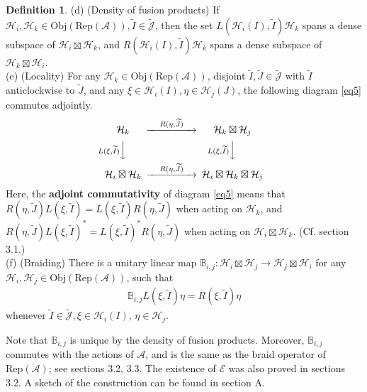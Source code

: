 \documentclass[12pt,a4paper]{article}
\theoremstyle{definition}
\newtheorem{df}{Definition}[subsection]
\theoremstyle{plain}
\newcommand{\mc}{\mathcal}
\newcommand{\wtd}{\widetilde}
\newcommand{\scr}{\mathscr}
\newcommand{\Jtd}{\widetilde{\mathcal J}}
\newcommand{\RepA}{\mathrm{Rep}(\mc A)}
\newcommand{\mbb}{\mathbb}
\newcommand{\Obj}{\mathrm{Obj}}
\numberwithin{equation}{subsection}
\begin{document}
\begin{df}
	(d) (Density of fusion products) If $\mc H_i,\mc H_k\in\Obj(\RepA),\wtd I\in\Jtd$, then the set $L(\mc H_i(I),\wtd I)\mc H_k$ spans a dense subspace of $\mc H_i\boxtimes\mc H_k$, and $R(\mc H_i(I),\wtd I)\mc H_k$ spans a dense subspace of $\mc H_k\boxtimes\mc H_i$.\\
	(e) (Locality) For any $\mc H_k\in\Obj(\RepA)$, disjoint $\wtd I,\wtd J\in\Jtd$ with $\wtd I$ anticlockwise to $\wtd J$, and any $\xi\in\mc H_i(I),\eta\in\mc H_j(J)$, the following diagram \eqref{eq5}  commutes adjointly.
	\begin{align}\label{eq5}
	\begin{CD}
	\mc H_k @> \quad R(\eta,\wtd J)\quad   >> \mc H_k\boxtimes\mc H_j\\
	@V L(\xi,\wtd I)   V  V @V L(\xi,\wtd I) VV\\
	\mc H_i\boxtimes\mc H_k @> \quad R(\eta,\wtd J) \quad  >> \mc H_i\boxtimes\mc H_k\boxtimes\mc H_j
	\end{CD}
	\end{align}
	Here, the \textbf{adjoint commutativity} of diagram \eqref{eq5} means that $R(\eta,\wtd J)L(\xi,\wtd I)=L(\xi,\wtd I)R(\eta,\wtd J)$ when acting on $\mc H_k$, and $R(\eta,\wtd J)L(\xi,\wtd I)^*=L(\xi,\wtd I)^*R(\eta,\wtd J)$ when acting on $\mc H_i\boxtimes\mc H_k$. (Cf. \cite{Gui21a} section 3.1.)\\
	(f) (Braiding) There is a unitary linear map $\mbb B_{i,j}:\mc H_i\boxtimes\mc H_j\rightarrow\mc H_j\boxtimes \mc H_i$  for any $\mc H_i,\mc H_j\in\Obj(\RepA)$, such that  
	\begin{align}
	\mbb B_{i,j} L(\xi,\wtd I)\eta=R(\xi,\wtd I)\eta
	\end{align}
	whenever $\wtd I\in\Jtd,\xi\in\mc H_i(I)$, $\eta\in\mc H_j$.
\end{df}



Note that $\mbb B_{i,j}$ is unique by the density of fusion products. Moreover, $\mbb B_{i,j}$ commutes with the actions of $\mc A$, and  is the same as the braid operator of $\RepA$; see \cite{Gui21a} sections 3.2, 3.3. The existence of $\scr E$ was also proved in \cite{Gui21a} sections 3.2. A sketch of the construction can be found in \cite{Gui21b} section A.
\end{document}
